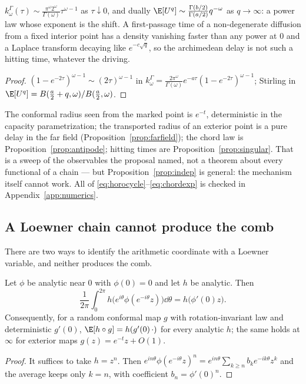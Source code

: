 \begin{proposition}\label{prop:singular}
$k^\Gamma_\omega(\tau)\sim\frac{\pi^\omega2^\omega}{\Gamma(\omega)}\tau^{\omega-1}$
as $\tau\downarrow0$, and dually
$\E[U^q]\sim\frac{\Gamma(b/2)}{\Gamma(a/2)}q^{-\omega}$ as $q\to\infty$: a power
law whose exponent is the shift. A first-passage time of a non-degenerate
diffusion from a fixed interior point has a density vanishing faster than any
power at $0$ and a Laplace transform decaying like $e^{-c\sqrt q}$, so the
archimedean delay is not such a hitting time, whatever the driving.
\end{proposition}
\begin{proof}
$(1-e^{-2\tau})^{\omega-1}\sim(2\tau)^{\omega-1}$ in
$k^\Gamma_\omega=\frac{2\pi^\omega}{\Gamma(\omega)}e^{-a\tau}(1-e^{-2\tau})^{\omega-1}$;
Stirling in $\E[U^q]=B(\frac a2+q,\omega)/B(\frac a2,\omega)$.
\end{proof}

The conformal radius seen from the marked point is $e^{-t}$, deterministic in the
capacity parametrization; the transported radius of an exterior point is a pure
delay in the far field (Proposition~\ref{prop:farfield}); the chord law is
Proposition~\ref{prop:antipode}; hitting times are
Proposition~\ref{prop:singular}. That is a sweep of the observables the proposal
named, not a theorem about every functional of a chain --- but
Proposition~\ref{prop:indep} is general: the mechanism itself cannot work.
All of \eqref{eq:horocycle}--\eqref{eq:chordexp} is checked in
Appendix~\ref{app:numerics}.

\subsection{A Loewner chain cannot produce the comb}\label{sec:nocomb}

There are two ways to identify the arithmetic coordinate with a Loewner
variable, and neither produces the comb.

\begin{lemma}\label{lem:rotation}
Let $\phi$ be analytic near $0$ with $\phi(0)=0$ and let $h$ be analytic. Then
\begin{equation}\label{eq:rotation}
 \frac1{2\pi}\int_0^{2\pi}h\big(e^{i\theta}\phi(e^{-i\theta}z)\big)\dd\theta=h\big(\phi'(0)z\big).
\end{equation}
Consequently, for a random conformal map $g$ with rotation-invariant law and
deterministic $g'(0)$, $\E[h\circ g]=h(g'(0)\,\cdot)$ for every analytic $h$;
the same holds at $\infty$ for exterior maps $g(z)=e^{-t}z+O(1)$.
\end{lemma}
\begin{proof}
It suffices to take $h=z^n$. Then $e^{in\theta}\phi(e^{-i\theta}z)^n=e^{in\theta}\sum_{k\geq n}b_ke^{-ik\theta}z^k$
and the average keeps only $k=n$, with coefficient $b_n=\phi'(0)^n$.
\end{proof}

